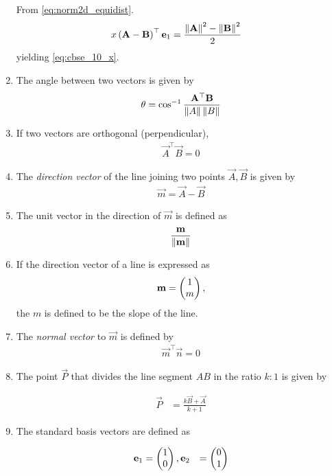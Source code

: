 \documentclass[journal,12pt,onecolumn]{IEEEtran}
\renewcommand\thesection{\arabic{section}}
\renewcommand\thesubsection{\thesection.\arabic{subsection}}
\begin{document}
\begin{enumerate}[label=\thesubsection.\arabic*.,ref=\thesubsection.\theenumi]
  \solution 
  From \eqref{eq:norm2d_equidist}.
  \begin{align}
	   x\left(\mathbf{A}-\mathbf{B}\right)^{\top }\mathbf{e}_1
		  &=
	  \frac{\left\lVert\mathbf{A}\right\rVert^2 -\left\lVert\mathbf{B}\right\rVert^2 }{2}
   \end{align}
	  yielding \eqref{eq:cbse_10_x}.
  \item The angle between two vectors is given by 
  \begin{align}
    \label{eq:angle2d}
    \theta = \cos^{-1}\frac{\mathbf{A}^{\top} \mathbf{B}}{\left\lVert A\right\rVert\left\lVert B\right\rVert}
  \end{align}
  \item If two vectors are orthogonal (perpendicular), 
  \begin{align}
    \label{eq:angle2d_orth}
\vec{A}^{\top} \vec{B} = 0
  \end{align}

  \item The {\em direction vector} of the line joining two points $\vec{A},\vec{B}$ is given by 
  \begin{align}
    \label{eq:dir_vec}
    \vec{m} = \vec{A}-\vec{B}
  \end{align}
\item The unit vector in the direction of $\vec{m}$ is defined as
\begin{align}
    \frac{\mathbf{m}}{\left\lVert\mathbf{m}\right\rVert}
\end{align}
\item If the direction vector of a line is expressed as 
	\begin{align}
    \mathbf{m} = \begin{pmatrix}1\\m\end{pmatrix},
\end{align}
 the $m$ is defined to be the {\em} slope of the line. 
  \item The {\em normal vector} to $\vec{m}$ is defined by 
  \begin{align}
    \label{eq:normal_vec}
    \vec{m}^{\top}  \vec{n} = 0
  \end{align}
  \item The point $\vec{P}$ that divides the line segment $AB$ in the ratio $k:1$  is given by 

  \begin{align}
	  \vec{P}&= \frac{k\vec{B}+ \vec{A}}{k+1}
	  \label{eq:section_formula}
  \end{align}
\item  The standard basis vectors are defined as 

  \begin{align}
  \mathbf{e}_1&= \begin{pmatrix}1\\0\end{pmatrix}, 
  \mathbf{e}_2&= \begin{pmatrix}0\\1\end{pmatrix} 
  \end{align}
\end{enumerate}
\end{document}

